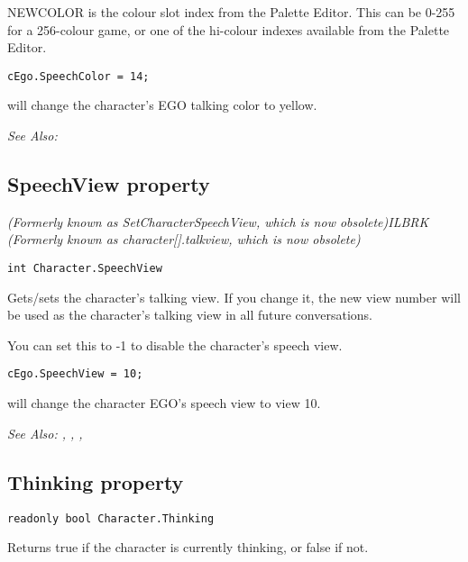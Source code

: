 NEWCOLOR is the colour slot index from the Palette Editor. This can be 0-255 for
a 256-colour game, or one of the hi-colour indexes available from the Palette Editor.

\begin{verbatim}
cEgo.SpeechColor = 14;
\end{verbatim}
will change the character's EGO talking color to yellow.

\it{See Also:} 


\subsection{SpeechView property}\label{Character.SpeechView}%

\it{(Formerly known as SetCharacterSpeechView, which is now obsolete)}ILBRK
\it{(Formerly known as character[].talkview, which is now obsolete)}

\begin{verbatim}
int Character.SpeechView
\end{verbatim}
Gets/sets the character's talking view. If you change it, the new view number will
be used as the character's talking view in all future conversations.

You can set this to -1 to disable the character's speech view.

\begin{verbatim}
cEgo.SpeechView = 10;
\end{verbatim}
will change the character EGO's speech view to view 10.

\it{See Also:} ,
,
,


\subsection{Thinking property}\label{Character.Thinking}%

\begin{verbatim}
readonly bool Character.Thinking
\end{verbatim}
Returns true if the character is currently thinking, or false if not.

